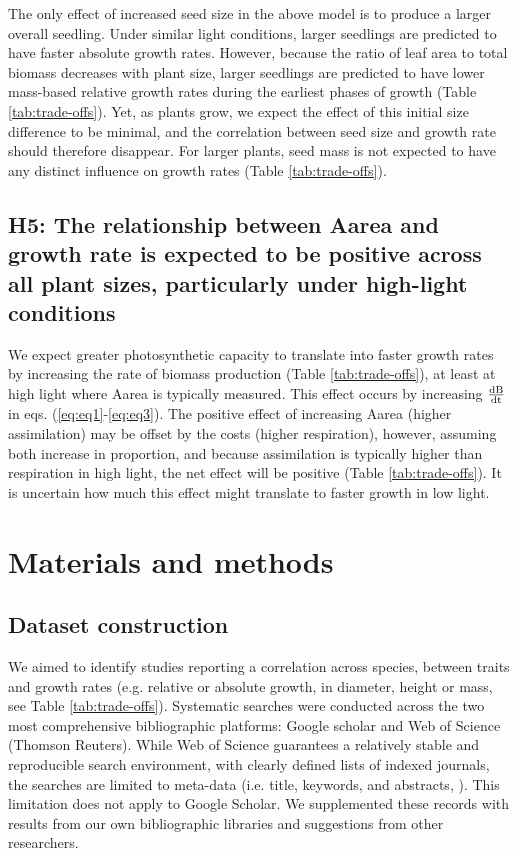 \documentclass[a4paper,11pt]{article}
\begin{document}
The only effect of increased seed size in the above model is to produce a larger overall seedling. Under similar light conditions, larger seedlings are predicted to have faster absolute growth rates. However, because the ratio of leaf area to total biomass decreases with plant size, larger seedlings are predicted to have lower mass-based relative growth rates during the earliest phases of growth \citep{Turnbull:2012ew}(Table \ref{tab:trade-offs}). Yet, as plants grow, we expect the effect of this initial size difference to be minimal, and the correlation between seed size and growth rate should therefore disappear. For larger plants, seed mass is not expected to have any distinct influence on growth rates (Table \ref{tab:trade-offs}).

\subsection*{H5: The relationship between Aarea and growth rate is expected to be positive across all plant sizes, particularly under high-light conditions}

We expect greater photosynthetic capacity to translate into faster growth rates by increasing the rate of biomass production (Table \ref{tab:trade-offs}), at least at high light where Aarea is typically measured. This effect occurs by increasing  $\frac{\rm{d} B}{\rm{d} t} $ in eqs. (\ref{eq:eq1}-\ref{eq:eq3}). The positive effect of increasing Aarea (higher assimilation) may be offset by the costs (higher respiration), however, assuming both increase in proportion, and because assimilation is typically higher than respiration in high light, the net effect will be positive (Table \ref{tab:trade-offs}). It is uncertain how much this effect might translate to faster growth in low light.

\section*{Materials and methods}\label{material-and-methods}

\subsection*{Dataset construction}\label{data-construction}

We aimed to identify studies reporting a correlation across species, between traits and growth rates (e.g. relative or absolute growth, in diameter, height or mass, see Table \ref{tab:trade-offs}). Systematic searches were conducted across the two most comprehensive bibliographic platforms: Google scholar and Web of Science (Thomson Reuters). While Web of Science guarantees a relatively stable and reproducible search environment, with clearly defined lists of indexed journals, the searches are limited to meta-data (i.e. title, keywords, and abstracts, \citealt{Beckmann:2012hn}). This limitation does not apply to Google Scholar. We supplemented these records with results from our own bibliographic libraries and suggestions from other researchers.
\end{document}
